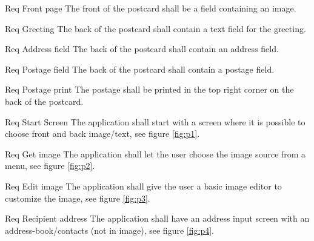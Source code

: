 \documentclass[10pt,a4paper]{article}
\begin{document}
\begin {description}
	\item [Req \thesubsubsection {.\thedesign} Front page] The front of the postcard shall be a field containing an image.
	\item [Req \thesubsubsection {.\thedesign} Greeting] The back of the postcard shall contain a text field for the greeting.
	\item [Req \thesubsubsection {.\thedesign} Address field] The back of the postcard shall contain an address field.
	\item [Req \thesubsubsection {.\thedesign} Postage field] The back of the postcard shall contain a postage field. 
	\item [Req \thesubsubsection {.\thedesign} Postage print] The postage shall be printed in the top right corner on the back of the postcard. 
	\item [Req \thesubsubsection {.\thedesign} Start Screen] The application shall start with a screen where it is possible to choose front and back image/text, see figure \ref{fig:p1}.
	\item [Req \thesubsubsection {.\thedesign} Get image] The application shall let the user choose the image source from a menu, see figure \ref{fig:p2}.
	\item [Req \thesubsubsection {.\thedesign} Edit image] The application shall give the user a basic image editor to customize the image, see figure \ref{fig:p3}.
	\item [Req \thesubsubsection {.\thedesign} Recipient address] The application shall have an address input screen with an address-book/contacts (not in image), see figure \ref{fig:p4}.
\end{description}
\end{document}
